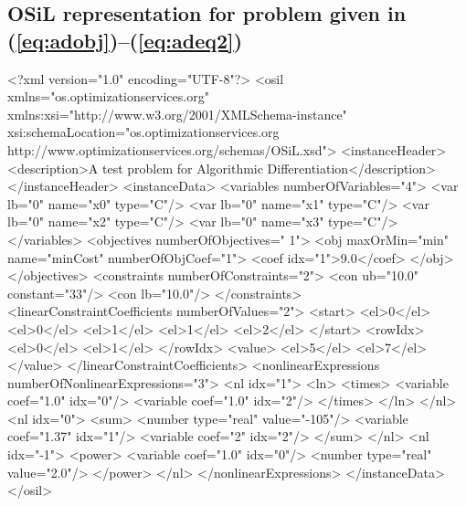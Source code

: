 \documentclass[11pt]{article}
\newcommand{\bibpath}{/Users/kmartin/Documents/files/misc}
\renewcommand{\_}{{\char"5F}}
\renewcommand{\{}{{\char"7B}}
\renewcommand{\}}{{\char"7D}}
\renewcommand{\^}{{\char"0D}}
\renewcommand{\'}{{\char"0D}}
\begin{document}
\subsection{OSiL representation for problem given in (\ref{eq:adobj})--(\ref{eq:adeq2})}\label{section:adexample}

\begin{verbatimtab}
<?xml version="1.0" encoding="UTF-8"?>
<osil xmlns="os.optimizationservices.org"
xmlns:xsi="http://www.w3.org/2001/XMLSchema-instance"
xsi:schemaLocation="os.optimizationservices.org
http://www.optimizationservices.org/schemas/OSiL.xsd">
	<instanceHeader>
		<description>A test problem for Algorithmic Differentiation</description>
	</instanceHeader>
	<instanceData>
		<variables numberOfVariables="4">
			<var lb="0" name="x0" type="C"/>
			<var lb="0" name="x1" type="C"/>
			<var lb="0" name="x2" type="C"/>
			<var lb="0" name="x3" type="C"/>
		</variables>
		<objectives numberOfObjectives=" 1">
			<obj maxOrMin="min" name="minCost" numberOfObjCoef="1">
				<coef idx="1">9.0</coef>
			</obj>
		</objectives>
		<constraints numberOfConstraints="2">
			<con ub="10.0" constant="33"/>
			<con lb="10.0"/>
		</constraints>
		<linearConstraintCoefficients numberOfValues="2">
			<start>
				<el>0</el>
				<el>0</el>
				<el>1</el>
				<el>1</el>
				<el>2</el>
			</start>
			<rowIdx>
				<el>0</el>
				<el>1</el>
			</rowIdx>
			<value>
				<el>5</el>
				<el>7</el>
			</value>
		</linearConstraintCoefficients>
		<nonlinearExpressions numberOfNonlinearExpressions="3">
			<nl idx="1">
				<ln>
					<times>
						<variable coef="1.0" idx="0"/>
						<variable coef="1.0" idx="2"/>
					</times>	
				</ln>
			</nl>
			<nl idx="0">
				<sum>
					<number type="real" value="-105"/>
					<variable coef="1.37" idx="1"/>
					<variable coef="2" idx="2"/>
				</sum>	
			</nl>
			<nl idx="-1">
				<power>
					<variable coef="1.0" idx="0"/>
					<number type="real" value="2.0"/>
				</power>
			</nl>
		</nonlinearExpressions>
	</instanceData>
</osil>
\end{verbatimtab}



\end{document}
